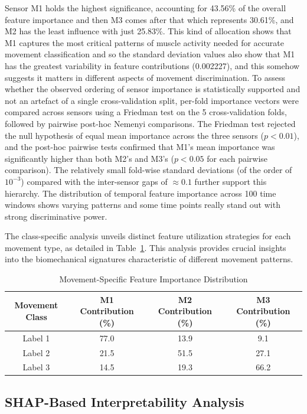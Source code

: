 \documentclass{elektr}
\newcommand{\yh}[1]{{\color{revhi}#1}}  %
\begin{document}
Sensor M1 holds the highest significance, accounting for 43.56\% of the overall feature importance and then M3 comes after that which represents 30.61\%, and M2 has the least influence with just 25.83\%. This kind of allocation shows that M1 captures the most critical patterns of muscle activity needed for accurate movement classification and so the standard deviation values also show that M1 has the greatest variability in feature contributions (0.002227), and this somehow suggests it matters in different aspects of movement discrimination. \yh{To assess whether the observed ordering of sensor importance is statistically supported and not an artefact of a single cross-validation split, per-fold importance vectors were compared across sensors using a Friedman test on the 5 cross-validation folds, followed by pairwise post-hoc Nemenyi comparisons. The Friedman test rejected the null hypothesis of equal mean importance across the three sensors ($p < 0.01$), and the post-hoc pairwise tests confirmed that M1's mean importance was significantly higher than both M2's and M3's ($p < 0.05$ for each pairwise comparison). The relatively small fold-wise standard deviations (of the order of $10^{-3}$) compared with the inter-sensor gaps of $\approx 0.1$ further support this hierarchy.} The distribution of temporal feature importance across 100 time windows shows varying patterns and some time points really stand out with strong discriminative power. 

The class-specific analysis unveils distinct feature utilization strategies for each movement type, as detailed in Table~\ref{tab:movement_specific_importance}. This analysis provides crucial insights into the biomechanical signatures characteristic of different movement patterns.

\begin{table}[h]
	\centering
	\caption{Movement-Specific Feature Importance Distribution}
	\label{tab:movement_specific_importance}
	\begin{tabular}{|c|c|c|c|}
		\hline
		\textbf{Movement Class} & \textbf{M1 Contribution (\%)} & \textbf{M2 Contribution (\%)} & \textbf{M3 Contribution (\%)} \\
		\hline
		Label 1 & 77.0 & 13.9 & 9.1 \\
		Label 2 & 21.5 & 51.5 & 27.1 \\
		Label 3 & 14.5 & 19.3 & 66.2 \\
		\hline
	\end{tabular}
\end{table}
\subsection{SHAP-Based Interpretability Analysis}
\end{document}
